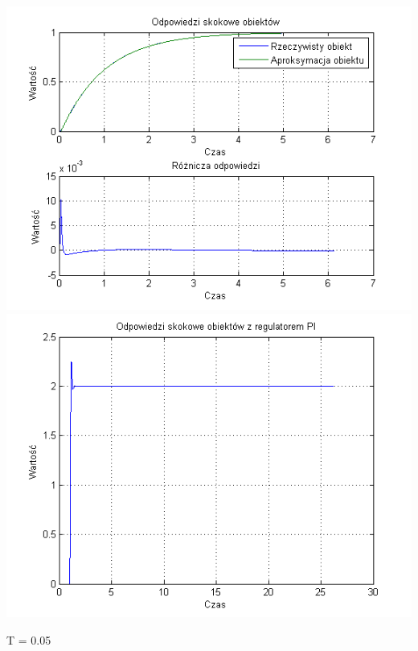 \documentclass[10pt,a4paper]{article}
\begin{document}
\begin{center}
\includegraphics[scale=1]{images/jeden/skrypt_89.png}\\
\includegraphics[scale=1]{images/jeden/skrypt_90.png}\\
\end{center}
\newpage
T = 0.05
\end{document}
